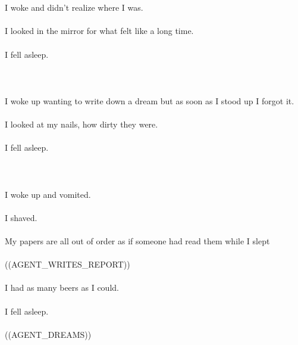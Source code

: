 \documentclass{article}
\begin{document}
    \section{}
    I woke and didn't realize where I was.\\\\I looked in the mirror for what felt like a long time.\\\\I fell asleep.\\\\
    \newpage
    
    \section{}
    I woke up wanting to write down a dream but as soon as I stood up I forgot it.\\\\I looked at my nails, how dirty they were.\\\\I fell asleep.\\\\
    \newpage
    
    \section{}
    I woke up and vomited.\\\\I shaved.\\\\My papers are all out of order as if someone had read them while I slept\\\\((AGENT_WRITES_REPORT))\\\\I had as many beers as I could.\\\\I fell asleep.\\\\((AGENT_DREAMS))\\\\
    \newpage
    
\end{document}
